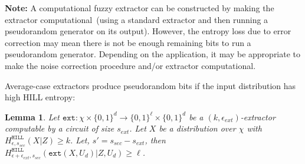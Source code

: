 \documentclass[11pt]{article}
\newcommand{\defref}[1]{\mbox{Definition~\ref{#1}}}
\newcommand{\lemref}[1]{\mbox{Lemma~\ref{#1}}}
\newcommand{\zo}{\ensuremath{\{0, 1\}}}
\newcommand{\hill}{\ensuremath{\mathtt{HILL}}\xspace}
\newcommand{\unp}{\ensuremath{\mathtt{unp}}\xspace}
\newcommand{\ext}{\ensuremath{\mathtt{ext}}}
\newcommand{\rext}{\ensuremath{\mathtt{rext}}}
\newtheorem{lemma}[theorem]{Lemma}
\newtheorem{definition}[theorem]{Definition}
\begin{document}
\textbf{Note: }A computational fuzzy extractor can be constructed by making the extractor computational~(using a standard extractor and then running a pseudorandom generator on its output).  However, the entropy loss due to error correction may mean there is not be enough remaining bits to run a pseudorandom generator.  Depending on the application, it may be appropriate to make the noise correction procedure and/or extractor computational.

Average-case extractors produce pseudorandom bits if the input distribution has high HILL entropy:
\begin{lemma}
Let $\ext: \chi \times \zo^d \rightarrow \zo^\ell \times \zo^d$ be a $(k, \epsilon_{ext})$-extractor computable by a circuit of size $s_{ext}$.  Let $X$ be a distribution over $\chi$ with $H^{\hill}_{\epsilon, s_{sec}}(X| Z)\geq k$.  Let, $s' = s_{sec}-s_{ext}$, then 
$H^{\hill}_{\epsilon+\epsilon_{ext}, s_{sec}}(\ext (X, U_d) | Z, U_d)\geq \ell$.
\end{lemma}
\end{document}
